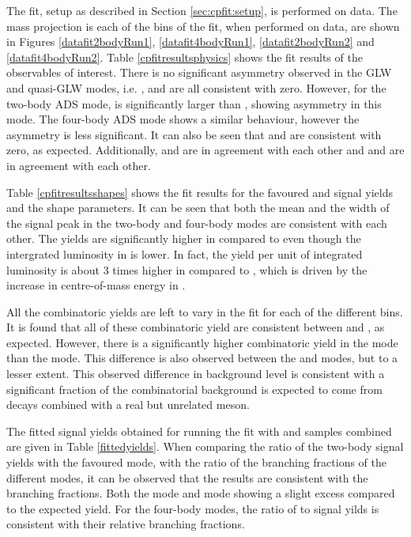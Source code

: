 The \CP fit, setup as described in Section \ref{sec:cpfit:setup}, is performed on data. The mass projection is each of the bins of the \CP fit, when performed on data, are shown in Figures \ref{datafit2bodyRun1}, \ref{datafit4bodyRun1}, \ref{datafit2bodyRun2} and \ref{datafit4bodyRun2}. Table \ref{cpfitresultsphysics} shows the \CP fit results of the \CP observables of interest. There is no significant asymmetry observed in the GLW and quasi-GLW modes, i.e. \Akk, \Apipi and \Apipipipi are all consistent with zero. However, for the two-body ADS mode, \Rptwo is significantly larger than \Rmtwo, showing asymmetry in this mode. The four-body ADS mode shows a similar behaviour, however the asymmetry is less significant. It can also be seen that \Akpi and \Akpipipi are consistent with zero, as expected. Additionally, \Akk and \Apipi are in agreement with each other and \Rkk and \Rpipi are in agreement with each other. 

Table \ref{cpfitresultsshapes} shows the fit results for the favoured \kpi and \kpipipi signal yields and the shape parameters. It can be seen that both the mean and the width of the signal peak in the two-body and four-body modes are consistent with each other. The yields are significantly higher in \runtwo compared to \runone even though the intergrated luminosity in \runtwo is lower. In fact, the yield per unit of integrated luminosity is about 3 times higher in \runone compared to \runtwo, which is driven by the increase in centre-of-mass energy in \runtwo.

All the combinatoric yields are left to vary in the \CP fit for each of the different bins. It is found that all of these combinatoric yield are consistent between \Bm and \Bp, as expected. However, there is a significantly higher combinatoric yield in the \kpi mode than the \pik mode. This difference is also observed between the \kpipipi and \pikpipi modes, but to a lesser extent. This observed difference in background level is consistent with a significant fraction of the combinatorial background is expected to come from  decays combined with a real but unrelated \KS meson. 

The fitted signal yields obtained for running the fit with \Bp and \Bm samples combined are given in Table \ref{fittedyields}. When comparing the ratio of the two-body signal yields with the favoured mode, with the ratio of the branching fractions of the different \Dz modes, it can be observed that the results are consistent with the branching fractions. Both the \kk mode and \pik mode showing a slight excess compared to the expected yield. For the four-body modes, the ratio of \kpipipi to \pipipipi signal yilds is consistent with their relative branching fractions.

